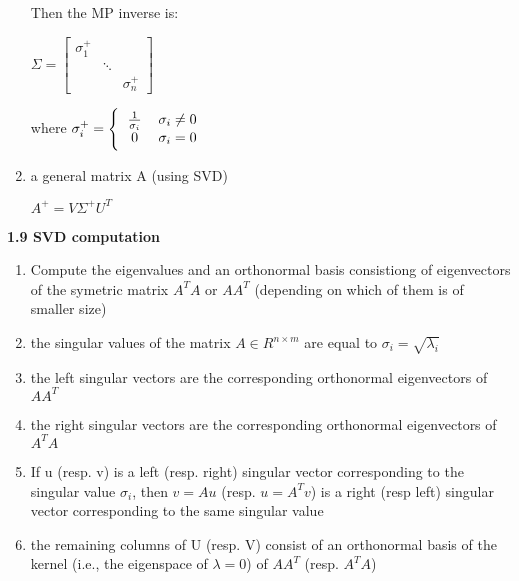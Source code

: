\documentclass{article}
\begin{document}
\begin{multicols}{3}
\begin{enumerate}
\begin{center}
\begin{math}
            \end{math}
        \end{center}
        Then the MP inverse is:
        \begin{center}
            \begin{math}
                \Sigma =
                \begin{bmatrix}
                    \sigma_1^+ &        & \\
                               & \ddots & \\
                               &        & \sigma_n^+
                \end{bmatrix}
            \end{math}
        \end{center}
        where \begin{math}
            \sigma_i^+ =
            \Bigg \{\begin{tabular}{ccc}
                $\frac{1}{\sigma_i}$  & $\sigma_i \neq 0$ & \\
                $0$                   & $\sigma_i = 0$ & \\
            \end{tabular}
        \end{math}
    \item a general matrix A (using SVD)
        \begin{center}
            \begin{math}
                A^+ = V \Sigma^+ U^T
            \end{math}
        \end{center}
\end{enumerate}

\textbf{1.9 SVD computation}
\begin{enumerate}
    \item Compute the eigenvalues and an orthonormal basis consistiong of eigenvectors
        of the symetric matrix $A^TA$ or $AA^T$ (depending on which of them is of smaller size)
    \item the singular values of the matrix $A \in R^{n \times m}$ are equal to $\sigma_i = \sqrt{\lambda_i}$
    \item the left singular vectors are the corresponding orthonormal eigenvectors of $AA^T$
    \item the right singular vectors are the corresponding orthonormal eigenvectors of $A^TA$
    \item If u (resp. v) is a left (resp. right) singular vector corresponding to the singular
        value $\sigma_i$, then $v = Au$ (resp. $u = A^Tv$) is a right (resp left) singular
        vector corresponding to the same singular value
    \item the remaining columns of U (resp. V) consist of an orthonormal basis of the kernel
        (i.e., the eigenspace of $\lambda = 0$) of $AA^T$ (resp. $A^TA$)
\end{enumerate}


\end{multicols}
\end{document}

